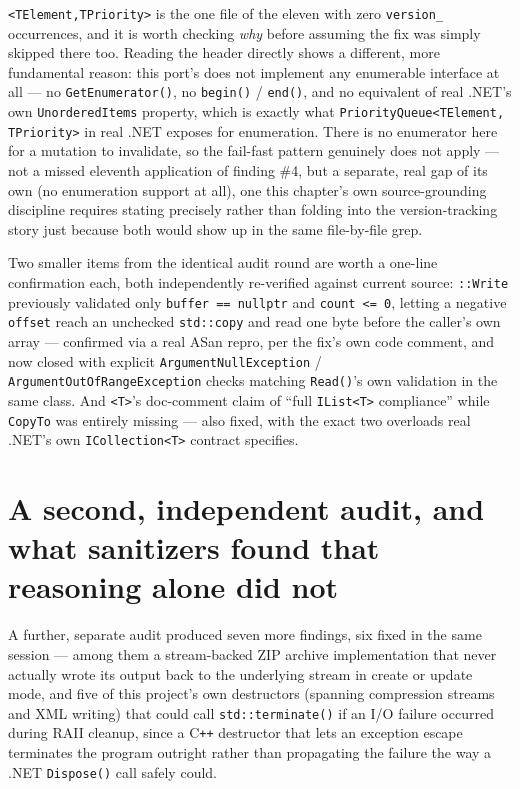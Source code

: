 \allowbreak{}\texttt{<TElement,TPriority>} is the one file of the eleven
with zero \texttt{version\_} occurrences, and it is worth checking \emph{why} before assuming the
fix was simply skipped there too. Reading the header directly shows a different, more fundamental
reason: this port's  does not implement any enumerable interface at all
--- no \texttt{GetEnumerator()}, no \texttt{begin()} / \texttt{end()}, and no equivalent of real
.NET's own \texttt{UnorderedItems} property, which is exactly what \texttt{PriorityQueue<TElement,
TPriority>} in real .NET exposes for enumeration. There is no enumerator here for a mutation to
invalidate, so the fail-fast pattern genuinely does not apply --- not a missed eleventh
application of finding \#4, but a separate, real gap of its own (no enumeration support at all),
one this chapter's own source-grounding discipline requires stating precisely rather than folding
into the version-tracking story just because both would show up in the same file-by-file grep.

Two smaller items from the identical audit round are worth a one-line confirmation each, both
independently re-verified against current source: \allowbreak{}
\texttt{::Write} previously validated only \texttt{buffer == nullptr} and \texttt{count <= 0},
letting a negative \texttt{offset} reach an unchecked \texttt{std::copy} and read one byte before
the caller's own array --- confirmed via a real ASan repro, per the fix's own code comment, and
now closed with explicit \texttt{ArgumentNullException} / \texttt{ArgumentOutOfRangeException}
checks matching \texttt{Read()}'s own validation in the same class. And
\allowbreak{}\texttt{<T>}'s doc-comment claim of ``full \texttt{IList<T>}
compliance'' while \texttt{CopyTo} was entirely missing --- also fixed, with the exact two
overloads real .NET's own \texttt{ICollection<T>} contract specifies.

\section[A second audit, and what sanitizers found that reasoning alone did not]{A second, independent audit, and what sanitizers found that reasoning alone did not}

A further, separate audit produced seven more findings, six fixed in the same session ---
among them a stream-backed ZIP archive implementation that never actually wrote its output
back to the underlying stream in create or update mode, and five of this project's own
destructors (spanning compression streams and XML writing) that could call
\texttt{std::terminate()} if an I/O failure occurred during RAII cleanup, since a
C\texttt{++} destructor that lets an exception escape terminates the program outright rather
than propagating the failure the way a .NET \texttt{Dispose()} call safely could.

